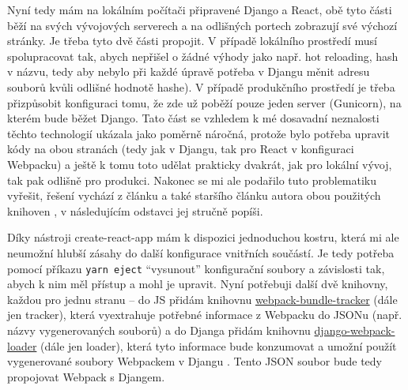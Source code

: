     Nyní tedy mám na lokálním počítači připravené Django a React, obě tyto části běží na svých vývojových serverech a na odlišných portech zobrazují své výchozí stránky. Je třeba tyto dvě části propojit. V případě lokálního prostředí musí spolupracovat tak, abych nepřišel o žádné výhody jako např. hot reloading, hash v názvu, tedy aby nebylo při každé úpravě potřeba v Djangu měnit adresu souborů kvůli odlišné hodnotě hashe). V případě produkčního prostředí je třeba přizpůsobit konfiguraci tomu, že zde už poběží pouze jeden server (Gunicorn), na kterém bude běžet Django. Tato část se vzhledem k mé dosavadní neznalosti těchto technologií ukázala jako poměrně náročná, protože bylo potřeba upravit kódy na obou stranách (tedy jak v Djangu, tak pro React v konfiguraci Webpacku) a ještě k tomu toto udělat prakticky dvakrát, jak pro lokální vývoj, tak pak odlišně pro produkci. Nakonec se mi ale podařilo tuto problematiku vyřešit, řešení vychází z článku \cite{webpack-loader2} a také staršího článku autora obou použitých knihoven \cite{webpack-loader1}, v následujícím odstavci jej stručně popíši.
    
    Díky nástroji create-react-app \cite{cra} mám k dispozici jednoduchou kostru, která mi ale neumožní hlubší zásahy do další konfigurace vnitřních součástí. Je tedy potřeba pomocí příkazu \verb|yarn eject| \enquote{vysunout} konfigurační soubory a závislosti tak, abych k nim měl přístup a mohl je upravit. Nyní potřebuji další dvě knihovny, každou pro jednu stranu -- do JS přidám knihovnu \href{https://github.com/owais/webpack-bundle-tracker}{webpack-bundle-tracker} (dále jen tracker), která vyextrahuje potřebné informace z Webpacku do JSONu \cite{webpack-bundle-tracker} (např. názvy vygenerovaných souborů) a do Djanga přidám knihovnu \href{https://github.com/owais/django-webpack-loader}{django-webpack-loader} (dále jen loader), která tyto informace bude konzumovat a umožní použít vygenerované soubory Webpackem v Djangu \cite{django-webpack-loader}. Tento JSON soubor bude tedy propojovat Webpack s Djangem.
    
